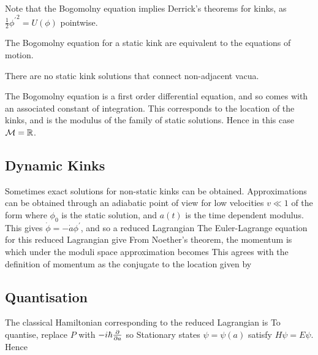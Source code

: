 \documentclass{article}
\begin{document}
\begin{remark}
Note that the Bogomolny equation implies Derrick's theorems for kinks, as $\frac{1}{2}{\phi^\prime}^2 = U(\phi)$ pointwise. 
\end{remark}

\begin{prop}
The Bogomolny equation for a static kink are equivalent to the equations of motion. 
\end{prop}

\begin{prop}
There are no static kink solutions that connect non-adjacent vacua.
\end{prop}

\begin{prop}
The Bogomolny equation is a first order differential equation, and so comes with an associated constant of integration. This corresponds to the location of the kinks, and is the modulus of the family of static solutions. Hence in this case $\mathcal{M} = \mathbb{R}$. 
\end{prop}
\subsection{Dynamic Kinks}
Sometimes exact solutions for non-static kinks can be obtained. Approximations can be obtained through an adiabatic point of view for low velocities $v \ll 1$ of the form 
where $\phi_0$ is the static solution, and $a(t)$ is the time dependent modulus. This gives $\dot{\phi} = -\dot{a}\phi^\prime$, and so a reduced Lagrangian 
The Euler-Lagrange equation for this reduced Lagrangian give
From Noether's theorem, the momentum is 
which under the moduli space approximation becomes 
This agrees with the definition of momentum as the conjugate to the location given by 
\subsection{Quantisation}

The classical Hamiltonian corresponding to the reduced Lagrangian is 
To quantise, replace $P$ with $-i\hbar \frac{\partial}{\partial a}$ so 
Stationary states $\psi = \psi(a)$ satisfy $H\psi = E\psi$. Hence 
\end{document}
